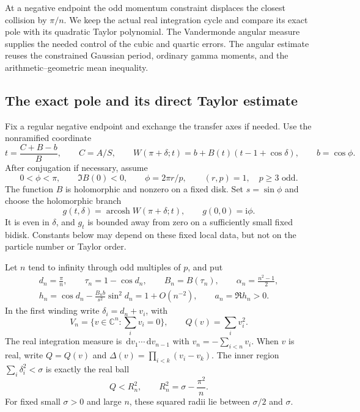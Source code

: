 \documentclass[11pt]{article}
\numberwithin{equation}{section}
\theoremstyle{definition}
\newcommand{\C}{\mathbb C}
\newcommand{\dd}{\,\mathrm d}
\newcommand{\ii}{\mathrm i}
\begin{document}
At a negative endpoint the odd momentum constraint displaces the closest
collision by $\pi/n$.  We keep the actual real integration cycle and
compare its exact pole with its quadratic Taylor polynomial.  The
Vandermonde angular measure supplies the needed control of the cubic and
quartic errors.  The angular estimate reuses the constrained Gaussian period,
ordinary gamma moments, and the arithmetic--geometric mean inequality.

\subsection{The exact pole and its direct Taylor estimate}

Fix a regular negative endpoint and exchange the transfer axes if needed.
Use the nonramified coordinate
\begin{equation}\label{eq:rc-coordinate}
 t=\frac{C+B-b}{B},\qquad C=A/S,\qquad
 W(\pi+\delta;t)=b+B(t)(t-1+\cos\delta),\qquad b=\cos\phi.
\end{equation}
After conjugation if necessary, assume
\begin{equation}\label{eq:rc-phase}
 0<\phi<\pi,\qquad \Im B(0)<0,\qquad
 \phi=2\pi r/p,\qquad (r,p)=1,\quad p\ge3\text{ odd}.
\end{equation}
The function $B$ is holomorphic and nonzero on a fixed disk.  Set
$s=\sin\phi$ and choose the holomorphic branch
\[
 g(t,\delta)=\operatorname{arcosh}W(\pi+\delta;t),\qquad
 g(0,0)=\ii\phi.
\]
It is even in $\delta$, and $g_t$ is bounded away from zero on a
sufficiently small fixed bidisk.  Constants below may depend on these
fixed local data, but not on the particle number or Taylor order.

Let $n$ tend to infinity through odd multiples of $p$, and put
\begin{gather}
 d_n=\frac\pi n,\qquad \tau_n=1-\cos d_n,\qquad
 B_n=B(\tau_n),\qquad \alpha_n=\frac{n^2-1}{2},\label{eq:rc-centres}\\
 h_n=\cos d_n-\frac{B_n b}{s^2}\sin^2d_n=1+O(n^{-2}),\qquad
 a_n=\Re h_n>0.\label{eq:rc-h}
\end{gather}
In the first winding write $\delta_i=d_n+v_i$, with
\[
 V_n=\{v\in\C^n:\sum_i v_i=0\},\qquad Q(v)=\sum_i v_i^2.
\]
The real integration measure is $\dd v_1\cdots\dd v_{n-1}$ with
$v_n=-\sum_{i<n}v_i$.  When $v$ is real, write $Q=Q(v)$ and
$\Delta(v)=\prod_{i<k}(v_i-v_k)$.  The inner region
$\sum_i\delta_i^2<\sigma$ is exactly the real ball
\begin{equation}\label{eq:rc-actual-ball}
 Q<R_n^2,\qquad R_n^2=\sigma-\frac{\pi^2}{n}.
\end{equation}
For fixed small $\sigma>0$ and large $n$, these squared radii lie
between $\sigma/2$ and $\sigma$.
\end{document}
